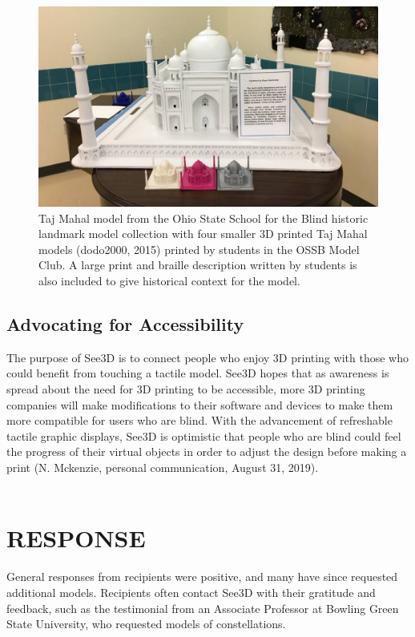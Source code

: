 \documentclass[11.5pt]{sig-alternate} %
\begin{document}
\begin{large}
\begin{figure}[ht]
    \centering
    \includegraphics[width=1\linewidth]{1116_Fig4.jpg}
    \caption{Taj Mahal model from the Ohio State School for the Blind historic landmark model collection with four smaller 3D printed Taj Mahal models (dodo2000, 2015) printed by students in the OSSB Model Club. A large print and braille description written by students is also included to give historical context for the model.}
\end{figure}

\subsection*{Advocating for Accessibility}

The purpose of See3D is to connect people who enjoy 3D printing with those who could benefit from touching a tactile model. See3D hopes that as awareness is spread about the need for 3D printing to be accessible, more 3D printing companies will make modifications to their software and devices to make them more compatible for users who are blind. With the advancement of refreshable tactile graphic displays, See3D is optimistic that people who are blind could feel the progress of their virtual objects in order to adjust the design before making a print (N. Mckenzie, personal communication, August 31, 2019). 
\\ \\
\section*{RESPONSE}

General responses from recipients were positive, and many have since requested additional models. Recipients often contact See3D with their gratitude and feedback, such as the testimonial from an Associate Professor at Bowling Green State University, who requested models of constellations.


\end{large}
\end{document}
